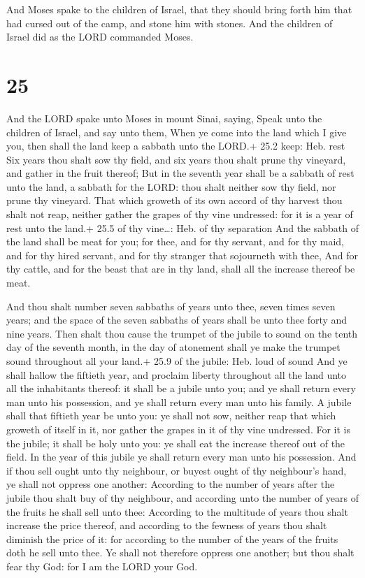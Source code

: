  And Moses spake to the children of Israel, that they
should bring forth him that had cursed out of the camp, and stone him
with stones. And the children of Israel did as the LORD commanded Moses.

\hypertarget{section-24}{%
\section{25}\label{section-24}}

 And the LORD spake unto Moses in mount Sinai, saying,
 Speak unto the children of Israel, and say unto them, When
ye come into the land which I give you, then shall the land keep a
sabbath unto the LORD.+ 25.2 keep: Heb. rest  Six years thou
shalt sow thy field, and six years thou shalt prune thy vineyard, and
gather in the fruit thereof;  But in the seventh year shall
be a sabbath of rest unto the land, a sabbath for the LORD: thou shalt
neither sow thy field, nor prune thy vineyard.  That which
groweth of its own accord of thy harvest thou shalt not reap, neither
gather the grapes of thy vine undressed: for it is a year of rest unto
the land.+ 25.5 of thy vine\ldots: Heb. of thy separation 
And the sabbath of the land shall be meat for you; for thee, and for thy
servant, and for thy maid, and for thy hired servant, and for thy
stranger that sojourneth with thee,  And for thy cattle, and
for the beast that are in thy land, shall all the increase thereof be
meat.

 And thou shalt number seven sabbaths of years unto thee,
seven times seven years; and the space of the seven sabbaths of years
shall be unto thee forty and nine years.  Then shalt thou
cause the trumpet of the jubile to sound on the tenth day of the seventh
month, in the day of atonement shall ye make the trumpet sound
throughout all your land.+ 25.9 of the jubile: Heb. loud of sound
 And ye shall hallow the fiftieth year, and proclaim
liberty throughout all the land unto all the inhabitants thereof: it
shall be a jubile unto you; and ye shall return every man unto his
possession, and ye shall return every man unto his family. 
A jubile shall that fiftieth year be unto you: ye shall not sow, neither
reap that which groweth of itself in it, nor gather the grapes in it of
thy vine undressed.  For it is the jubile; it shall be holy
unto you: ye shall eat the increase thereof out of the field.
 In the year of this jubile ye shall return every man unto
his possession.  And if thou sell ought unto thy neighbour,
or buyest ought of thy neighbour's hand, ye shall not oppress one
another:  According to the number of years after the jubile
thou shalt buy of thy neighbour, and according unto the number of years
of the fruits he shall sell unto thee:  According to the
multitude of years thou shalt increase the price thereof, and according
to the fewness of years thou shalt diminish the price of it: for
according to the number of the years of the fruits doth he sell unto
thee.  Ye shall not therefore oppress one another; but thou
shalt fear thy God: for I am the LORD your God.

